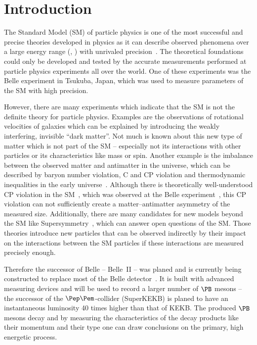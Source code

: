 \chapter{Introduction}

The Standard Model (SM) of particle physics is one of the most successful and precise theories developed in physics as it can describe observed phenomena over a large energy range (\cite{omg}, \cite{hydrogen}) with unrivaled precision~\cite{mu}. The theoretical foundations could only be developed and tested by the accurate measurements performed at particle physics experiments all over the world. One of these experiments was the Belle experiment in Tsukuba, Japan, which was used to measure parameters of the SM with high precision. 

However, there are many experiments which indicate that the SM is not the definite theory for particle physics. Examples are the observations of rotational velocities of galaxies \cite{galaxy} which can be explained by introducing the weakly interfering, invisible ``dark matter''. Not much is known about this new type of matter which is not part of the SM -- especially not its interactions with other particles or its characteristics like mass or spin. Another example is the imbalance between the observed matter and antimatter in the universe, which can be described by baryon number violation, C and CP violation and thermodynamic inequalities in the early universe~\cite{sakharov}. Although there is theoretically well-understood CP violation in the SM~\cite{CP_theory}, which was observed at the Belle experiment~\cite{CP}, this CP violation can not sufficiently create a matter--antimatter asymmetry of the measured size. Additionally, there are many candidates for new models beyond the SM like Supersymmetry~\cite{susy}, which can answer open questions of the SM. Those theories introduce new particles that can be observed indirectly by their impact on the interactions between the SM particles if these interactions are measured precisely enough.

Therefore the successor of Belle -- Belle~II -- was planed and is currently being constructed to replace most of the Belle detector~\cite{tdr}. It is built with advanced measuring devices and will be used to record a larger number of $\PB$ mesons -- the successor of the $\Pep\Pem$-collider (SuperKEKB) is planed to have an instantaneous luminosity 40 times higher than that of KEKB. The produced $\PB$ mesons decay and by measuring the characteristics of the decay products like their momentum and their type one can draw conclusions on the primary, high energetic process.

